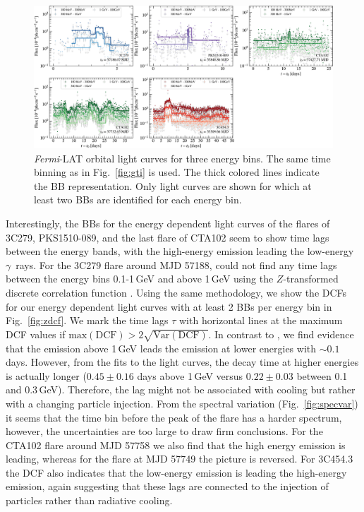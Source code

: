 \documentclass[twocolumn,linenumbers]{aastex62}
\newcommand{\Grays}{$\gamma$~rays\xspace}
\newcommand{\fermiLAT}{\emph{Fermi}-LAT\xspace}
\begin{document}
\begin{figure}
    \centering
    \includegraphics[width = .9 \linewidth]{figures/lc_ebins_ts9.pdf}
    \caption{\fermiLAT orbital light curves for three energy bins. The same time binning as in Fig.~\ref{fig:gti} is used. The thick colored lines indicate the BB representation. Only light curves are shown for which at least two BBs are identified for each energy bin.}
    \label{fig:lcebins}
\end{figure}

Interestingly, the BBs for the energy dependent light curves of the flares of 3C279, PKS1510-089, and the last flare of CTA102 seem to show time lags between the energy bands, with the high-energy emission leading the low-energy \Grays.
For the 3C279 flare around MJD 57188, \citet{2015ApJ...808L..48P} could not find any time lags between the energy bins 0.1-1\,GeV and above 1\,GeV using the $Z$-transformed discrete correlation function \citep[DCF;][]{1997ASSL..218..163A,2013arXiv1302.1508A}.
Using the same methodology, we show the DCFs for our energy dependent light curves with at least 2 BBs per energy bin in Fig.~\ref{fig:zdcf}.
We mark the time lags $\tau$ with horizontal lines at the maximum DCF values if $\mathrm{max}(\mathrm{DCF}) > 2 \sqrt{\mathrm{Var}(\mathrm{DCF})}$.
In contrast to \citet{2015ApJ...808L..48P}, we find evidence that the emission above 1\,GeV leads the emission at lower energies with $\sim 0.1$ days. 
However, from the fits to the light curves, the decay time at higher energies is actually longer ($0.45\pm0.16$ days above 1\,GeV versus $0.22 \pm 0.03$ between 0.1 and 0.3\,GeV). 
Therefore, the lag might not be associated with cooling but rather with a changing particle injection. 
From the spectral variation (Fig.~\ref{fig:specvar}) it seems that the time bin before the peak of the flare has a harder spectrum, however, the uncertainties are too large to draw firm conclusions.
For the CTA102 flare around MJD 57758 we also find that the high energy emission is leading, whereas for the flare at MJD 57749 the picture is reversed. 
For 3C454.3 the DCF also indicates that the low-energy emission is leading the high-energy emission, again suggesting that these lags are connected to the injection of particles rather than radiative cooling.
\end{document}
